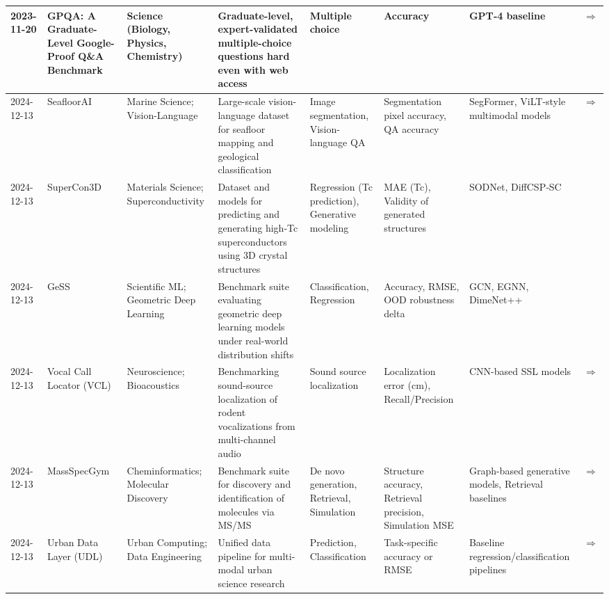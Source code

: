 \documentclass{article}
\begin{document}
\begin{landscape}
{\begin{longtable}{|p{1.5cm}|p{2.5cm}|p{2cm}|p{2cm}|p{3cm}|p{2cm}|p{2cm}|p{1cm}|}
2023-11-20 & GPQA: A Graduate-Level Google-Proof Q\&A Benchmark & Science (Biology, Physics, Chemistry) & Graduate-level, expert-validated multiple-choice questions hard even with web access & Multiple choice & Accuracy & GPT‑4 baseline & \cite{rein2023gpqa} \href{https://arxiv.org/abs/2311.12022}{$\Rightarrow$ } \\ \hline
2024-12-13 & SeafloorAI & Marine Science; Vision-Language & Large-scale vision-language dataset for seafloor mapping and geological classification & Image segmentation, Vision-language QA & Segmentation pixel accuracy, QA accuracy & SegFormer, ViLT-style multimodal models & \cite{nguyen2024seafloorai} \href{https://arxiv.org/abs/2411.00172}{$\Rightarrow$ } \\ \hline
2024-12-13 & SuperCon3D & Materials Science; Superconductivity & Dataset and models for predicting and generating high‑Tc superconductors using 3D crystal structures & Regression (Tc prediction), Generative modeling & MAE (Tc), Validity of generated structures & SODNet, DiffCSP‑SC & \cite{zhuang2024supercon3d} \\ \hline
2024-12-13 & GeSS & Scientific ML; Geometric Deep Learning & Benchmark suite evaluating geometric deep learning models under real-world distribution shifts & Classification, Regression & Accuracy, RMSE, OOD robustness delta & GCN, EGNN, DimeNet++ & \cite{zou2024gess} \\ \hline
2024-12-13 & Vocal Call Locator (VCL) & Neuroscience; Bioacoustics & Benchmarking sound-source localization of rodent vocalizations from multi-channel audio & Sound source localization & Localization error (cm), Recall/Precision & CNN-based SSL models & \cite{peterson2024vcl} \href{https://neurips.cc/virtual/2024/poster/97470}{$\Rightarrow$ } \\ \hline
2024-12-13 & MassSpecGym & Cheminformatics; Molecular Discovery & Benchmark suite for discovery and identification of molecules via MS/MS & De novo generation, Retrieval, Simulation & Structure accuracy, Retrieval precision, Simulation MSE & Graph-based generative models, Retrieval baselines & \cite{bushuiev2024massspecgym} \href{https://neurips.cc/virtual/2024/poster/97823}{$\Rightarrow$ } \\ \hline
2024-12-13 & Urban Data Layer (UDL) & Urban Computing; Data Engineering & Unified data pipeline for multi-modal urban science research & Prediction, Classification & Task-specific accuracy or RMSE & Baseline regression/classification pipelines & \cite{wang2024urbandatalayer} \href{https://neurips.cc/virtual/2024/poster/97837}{$\Rightarrow$ } \\ \hline

\end{longtable}}
\end{landscape}
\end{document}
